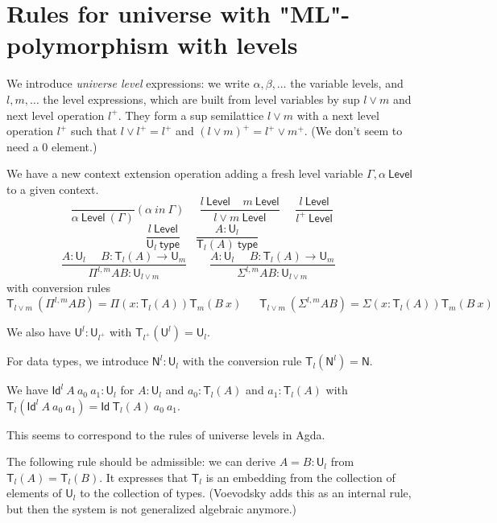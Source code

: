 \documentclass[10pt,a4paper]{article}
\newcommand{\Id}{\mathsf{Id}}
\def\NN{\mathsf{N}}
\def\UU{\mathsf{U}}
\def\Level{\mathsf{Level}}
\newcommand{\type}{\mathsf{type}}
\newcommand{\T}{\mathsf{T}}
\begin{document}
\section*{Rules for universe with "ML"-polymorphism with levels}

We introduce {\em universe level} expressions: we write $\alpha,\beta,\dots$
the variable levels, and $l,m,\dots$ the level expressions, which are built from level variables
by sup $l \vee m$ and next level operation $l^+$.
They form a sup semilattice $l\vee m$
with a next level operation $l^+$ such that $l \vee l^+ = l^+$
and $(l\vee m)^+ = l^+\vee m^+$. (We don't seem to need a $0$ element.)

We have a new context extension operation adding a fresh level variable $\Gamma,\alpha~\Level$
to a given context.
$$
\frac{}{\alpha~\Level~(\Gamma)}(\alpha~in~\Gamma)~~~~~~
\frac{l~\Level~~~~~m~\Level}{l\vee m~\Level}~~~~~~
\frac{l~\Level}{l^+~\Level}~~~~~~
$$
$$
\frac{l~\Level}{\UU_{l}~\type}~~~~~~
\frac{A:\UU_{l}}{\T_{l}(A)~\type}~~~~~~
$$
$$
\frac{A:\UU_{l}~~~~~~B:\T_{l}(A)\rightarrow \UU_{m}}
     {\Pi^{l,m} A B:\UU_{l\vee m}}~~~~~~~~~
\frac{A:\UU_{l}~~~~~~B:\T_{l}(A)\rightarrow \UU_{m}}
     {\Sigma^{l,m} A B:\UU_{l\vee m}}~~~~~~~~~
$$
with conversion rules
$$
\T_{l\vee m}~(\Pi^{l,m} A B) = \Pi (x:\T_{l}(A)) \T_{m}(B~x)~~~~~~~
\T_{l\vee m}~(\Sigma^{l,m} A B) = \Sigma (x:\T_{l}(A)) \T_{m}(B~x)~~~~~~~
$$

\medskip

We also have ${\UU^{l}}:\UU_{l^+}$ with
$\T_{l^+}({\UU^{l}}) = \UU_{l}$.

\medskip

For data types, we introduce $\NN^{l}:\UU_{l}$ with the conversion rule
$\T_{l}(\NN^{l}) = \NN$.

We have $\Id^l~A~a_0~a_1:\UU_l$ for $A:\UU_l$ and $a_0:\T_l(A)$ and $a_1:\T_l(A)$
with $\T_l(\Id^l~A~a_0~a_1) = \Id~\T_l(A)~a_0~a_1$.

\medskip

 This seems to correspond to the rules of universe levels in Agda.

\medskip

The following rule should be admissible:
we can derive $A = B : \UU_l$ from $\T_l(A) = \T_l(B)$.
 It expresses that $\T_l$ is an embedding from the collection of elements of $\UU_l$
 to the collection of types.
 (Voevodsky \cite{VV} adds this as an internal rule, but then the system is not
 generalized algebraic anymore.)
\end{document}
